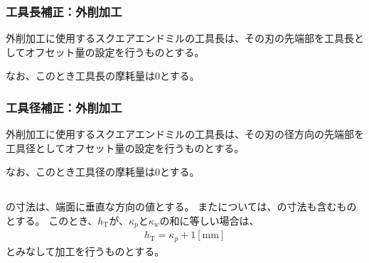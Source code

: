 \subsubsection{工具長補正：外削加工}
外削加工に使用するスクエアエンドミルの工具長は、その刃の先端部を工具長としてオフセット量の設定を行うものとする。

なお、このとき工具長の摩耗量は0とする。


\subsubsection{工具径補正：外削加工}
外削加工に使用するスクエアエンドミルの工具長は、その刃の径方向の先端部を工具径としてオフセット量の設定を行うものとする。

なお、このとき工具径の摩耗量は0とする。


\subsection{\OutcutLength}
\OutcutLength の寸法は、端面に垂直な方向の値とする。
また\TopOutcutLength については、\KeywayWidth の寸法も含むものとする。
このとき、\TopOutcutLength$h_\mathrm T$が、\KeywayPos$\kappa_p$と\KeywayWidth$\kappa_w$の和に等しい場合は、
\begin{align*}
  h_\mathrm T = \kappa_p+1[\text{mm}]
\end{align*}
とみなして加工を行うものとする。


